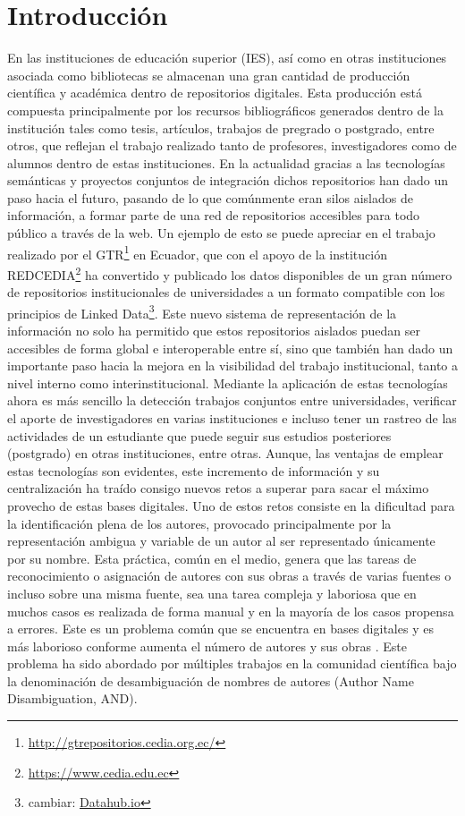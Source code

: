 \documentclass[conference]{IEEEtran}
\begin{document}
\section{Introducción}
En las instituciones de educación superior (IES), así como en otras instituciones asociada como bibliotecas se almacenan una gran cantidad de producción científica y académica dentro de repositorios digitales. Esta producción está compuesta principalmente por los  recursos bibliográficos generados dentro de la institución tales como tesis, artículos, trabajos de pregrado o postgrado, entre otros, que reflejan el trabajo realizado tanto de profesores, investigadores como de alumnos dentro de estas instituciones. En la actualidad gracias a las tecnologías  semánticas y proyectos conjuntos de integración  dichos repositorios han dado un paso hacia el futuro, pasando de lo que comúnmente eran silos aislados de información, a formar parte de  una red de  repositorios accesibles para todo público a través de la web. Un ejemplo  de esto se puede apreciar en el trabajo realizado por el GTR\footnote{\url{http://gtrepositorios.cedia.org.ec/}} en Ecuador, que con el apoyo de la institución REDCEDIA\footnote{\url{https://www.cedia.edu.ec}} ha convertido y publicado los datos disponibles de un gran número de repositorios institucionales de universidades a un formato compatible con los  principios de Linked Data\footnote{cambiar: \url{Datahub.io}}. Este nuevo sistema de representación de  la información no solo  ha permitido que estos repositorios aislados  puedan ser accesibles de forma global e interoperable entre sí, sino que también  han dado un importante paso hacia la mejora en  la visibilidad  del trabajo institucional,  tanto a nivel interno  como interinstitucional. Mediante la aplicación de estas tecnologías ahora es más sencillo la detección trabajos conjuntos entre  universidades, verificar el aporte de investigadores en varias instituciones e incluso tener un rastreo de las actividades de un estudiante que puede seguir sus estudios posteriores (postgrado) en otras instituciones, entre otras.  Aunque, las ventajas de emplear estas tecnologías son evidentes, este incremento de información y su centralización ha traído consigo  nuevos retos a superar para sacar el máximo provecho de estas bases digitales. Uno de estos retos  consiste en  la dificultad para  la identificación plena de  los  autores,  provocado principalmente por la representación ambigua y variable de un autor al ser  representado únicamente por su nombre.   Esta práctica, común en el medio,  genera que las tareas de  reconocimiento o asignación  de autores con sus obras a través de varias fuentes o incluso sobre una misma fuente, sea una tarea compleja y laboriosa que en muchos casos es realizada de forma manual y en la mayoría de los casos  propensa a errores. Este es un problema común que se encuentra en bases digitales y es más laborioso conforme aumenta el número de autores y sus obras \cite{Lee:2007:YCC:1323688.1323690}. Este problema ha sido abordado  por múltiples trabajos  en la comunidad científica  bajo la denominación de desambiguación de nombres de autores (Author Name Disambiguation, AND).
\end{document}
